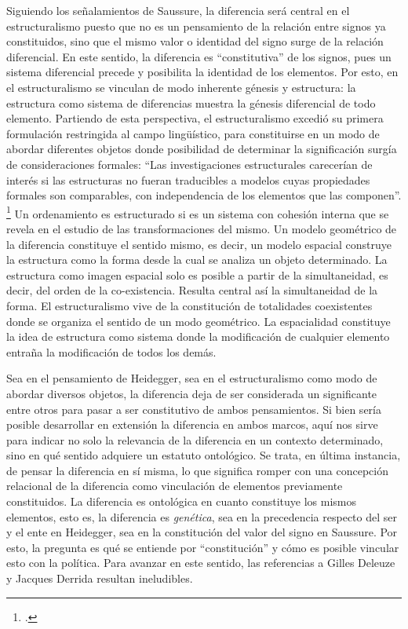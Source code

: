 Siguiendo los señalamientos de Saussure, la diferencia será central en el estructuralismo puesto que no es un pensamiento de la relación entre signos ya constituidos, sino que el mismo valor o identidad del signo surge de la relación diferencial. En este sentido, la diferencia es \enquote{constitutiva} de los signos, pues un sistema diferencial precede y posibilita la identidad de los elementos. Por esto, en el estructuralismo se vinculan de modo inherente génesis \linebreak  y estructura: la estructura como sistema de diferencias muestra la génesis diferencial de todo elemento. Partiendo de esta perspectiva, el estructuralismo excedió su primera formulación restringida al campo lingüístico, para constituirse en un modo de abordar diferentes objetos donde posibilidad de determinar la significación surgía de consideraciones formales: \enquote{Las investigaciones estructurales carecerían de interés si las estructuras no fueran traducibles a modelos cuyas propiedades formales son comparables, con independencia de los elementos que las componen}. \footcite[256]{@6971-LEVISTRAUSS1977} Un ordenamiento es estructurado si es un sistema con cohesión interna que se revela en el estudio de las transformaciones del mismo. Un modelo geométrico de la diferencia constituye el sentido mismo, es decir, un modelo espacial construye la estructura como la forma desde la cual se analiza un objeto determinado. La estructura como imagen espacial solo es posible a partir de la simultaneidad, es decir, del orden de la co-existencia. Resulta central así la simultaneidad de la forma. El estructuralismo vive de la constitución de totalidades coexistentes donde se organiza el sentido de un modo geométrico. La espacialidad constituye la idea de estructura como sistema donde la modificación de cualquier elemento entraña la modificación de todos los demás.

Sea en el pensamiento de Heidegger, sea en el estructuralismo como modo de abordar diversos objetos, la diferencia deja de ser considerada un significante entre otros para pasar a ser constitutivo de ambos pensamientos. Si bien sería posible desarrollar en extensión la diferencia en ambos marcos, aquí nos sirve para indicar no solo la relevancia de la diferencia en un contexto determinado, sino en qué sentido adquiere un estatuto ontológico. Se trata, en última instancia, de pensar la diferencia en sí misma, lo que significa romper con una concepción relacional de la diferencia como vinculación de elementos previamente constituidos. La diferencia es ontológica en cuanto constituye los mismos elementos, esto es, la diferencia es \emph{genética}, sea en la precedencia respecto del ser y el ente en Heidegger, sea en la constitución del valor del signo en Saussure. Por esto, la pregunta es qué se entiende por \enquote{constitución} y cómo es posible vincular esto con la política. Para avanzar en este sentido, las referencias a Gilles Deleuze y Jacques Derrida resultan ineludibles.

